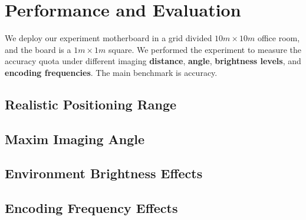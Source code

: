 \documentclass[conference]{IEEEtran}
\begin{document}
\section{\textbf{Performance and Evaluation}}

We deploy our experiment motherboard in a grid divided $10m \times 10m$ office room, and the board is a $1m \times 1m$ square. We performed the experiment to measure the accuracy quota under different imaging \textbf{distance}, \textbf{angle}, \textbf{brightness levels}, and \textbf{encoding frequencies}. The main benchmark is accuracy.
\subsection{\textbf{Realistic Positioning Range}}

\subsection{\textbf{Maxim Imaging Angle}}

\subsection{\textbf{Environment Brightness Effects}}

\subsection{\textbf{Encoding Frequency Effects}}














\end{document}
